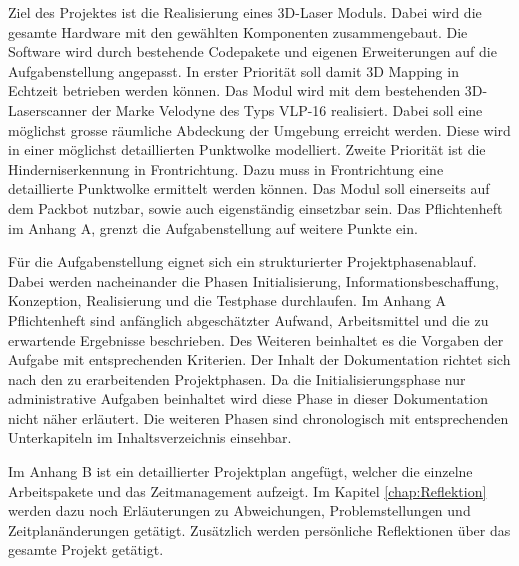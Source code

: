 Ziel des Projektes ist die Realisierung eines 3D-Laser Moduls. Dabei wird die gesamte Hardware mit den gewählten Komponenten zusammengebaut. Die Software wird durch bestehende Codepakete und eigenen Erweiterungen auf die Aufgabenstellung angepasst. In erster Priorität soll damit 3D Mapping in Echtzeit betrieben werden können. Das Modul wird mit dem bestehenden 3D-Laserscanner der Marke Velodyne des Typs VLP-16 realisiert. Dabei soll eine möglichst grosse räumliche Abdeckung der Umgebung erreicht werden. Diese wird in einer möglichst detaillierten Punktwolke modelliert. Zweite Priorität ist die Hinderniserkennung in Frontrichtung. Dazu muss in Frontrichtung eine detaillierte Punktwolke ermittelt werden können. Das Modul soll einerseits auf dem Packbot nutzbar, sowie auch eigenständig einsetzbar sein. Das Pflichtenheft im Anhang A, grenzt die Aufgabenstellung auf weitere Punkte ein.

Für die Aufgabenstellung eignet sich ein strukturierter Projektphasenablauf. Dabei werden nacheinander die Phasen Initialisierung, Informationsbeschaffung, Konzeption, Realisierung und die Testphase durchlaufen. Im Anhang A Pflichtenheft sind anfänglich abgeschätzter Aufwand, Arbeitsmittel und die zu erwartende Ergebnisse beschrieben. Des Weiteren beinhaltet es die Vorgaben der Aufgabe mit entsprechenden Kriterien.
Der Inhalt der Dokumentation richtet sich nach den zu erarbeitenden Projektphasen. Da die Initialisierungsphase nur administrative Aufgaben beinhaltet wird diese Phase in dieser Dokumentation nicht näher erläutert. Die weiteren Phasen sind chronologisch mit entsprechenden Unterkapiteln im Inhaltsverzeichnis einsehbar. 

Im Anhang B ist ein detaillierter Projektplan angefügt, welcher die einzelne Arbeitspakete und das Zeitmanagement aufzeigt. Im Kapitel \ref{chap:Reflektion} werden dazu noch Erläuterungen zu Abweichungen, Problemstellungen und Zeitplanänderungen getätigt. Zusätzlich werden persönliche Reflektionen über das gesamte Projekt getätigt. 







